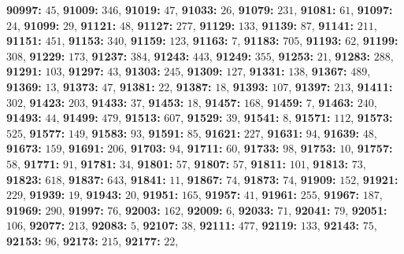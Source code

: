 \textsf{\bfseries 90997:} $45$, \textsf{\bfseries 91009:} $346$, \textsf{\bfseries 91019:} $47$, \textsf{\bfseries 91033:} $26$, \textsf{\bfseries 91079:} $231$, \textsf{\bfseries 91081:} $61$, \textsf{\bfseries 91097:} $24$, \textsf{\bfseries 91099:} $29$, \textsf{\bfseries 91121:} $48$, \textsf{\bfseries 91127:} $277$, \textsf{\bfseries 91129:} $133$, \textsf{\bfseries 91139:} $87$, \textsf{\bfseries 91141:} $211$, \textsf{\bfseries 91151:} $451$, \textsf{\bfseries 91153:} $340$, \textsf{\bfseries 91159:} $123$, \textsf{\bfseries 91163:} $7$, \textsf{\bfseries 91183:} $705$, \textsf{\bfseries 91193:} $62$, \textsf{\bfseries 91199:} $308$, \textsf{\bfseries 91229:} $173$, \textsf{\bfseries 91237:} $384$, \textsf{\bfseries 91243:} $443$, \textsf{\bfseries 91249:} $355$, \textsf{\bfseries 91253:} $21$, \textsf{\bfseries 91283:} $288$, \textsf{\bfseries 91291:} $103$, \textsf{\bfseries 91297:} $43$, \textsf{\bfseries 91303:} $245$, \textsf{\bfseries 91309:} $127$, \textsf{\bfseries 91331:} $138$, \textsf{\bfseries 91367:} $489$, \textsf{\bfseries 91369:} $13$, \textsf{\bfseries 91373:} $47$, \textsf{\bfseries 91381:} $22$, \textsf{\bfseries 91387:} $18$, \textsf{\bfseries 91393:} $107$, \textsf{\bfseries 91397:} $213$, \textsf{\bfseries 91411:} $302$, \textsf{\bfseries 91423:} $203$, \textsf{\bfseries 91433:} $37$, \textsf{\bfseries 91453:} $18$, \textsf{\bfseries 91457:} $168$, \textsf{\bfseries 91459:} $7$, \textsf{\bfseries 91463:} $240$, \textsf{\bfseries 91493:} $44$, \textsf{\bfseries 91499:} $479$, \textsf{\bfseries 91513:} $607$, \textsf{\bfseries 91529:} $39$, \textsf{\bfseries 91541:} $8$, \textsf{\bfseries 91571:} $112$, \textsf{\bfseries 91573:} $525$, \textsf{\bfseries 91577:} $149$, \textsf{\bfseries 91583:} $93$, \textsf{\bfseries 91591:} $85$, \textsf{\bfseries 91621:} $227$, \textsf{\bfseries 91631:} $94$, \textsf{\bfseries 91639:} $48$, \textsf{\bfseries 91673:} $159$, \textsf{\bfseries 91691:} $206$, \textsf{\bfseries 91703:} $94$, \textsf{\bfseries 91711:} $60$, \textsf{\bfseries 91733:} $98$, \textsf{\bfseries 91753:} $10$, \textsf{\bfseries 91757:} $58$, \textsf{\bfseries 91771:} $91$, \textsf{\bfseries 91781:} $34$, \textsf{\bfseries 91801:} $57$, \textsf{\bfseries 91807:} $57$, \textsf{\bfseries 91811:} $101$, \textsf{\bfseries 91813:} $73$, \textsf{\bfseries 91823:} $618$, \textsf{\bfseries 91837:} $643$, \textsf{\bfseries 91841:} $11$, \textsf{\bfseries 91867:} $74$, \textsf{\bfseries 91873:} $74$, \textsf{\bfseries 91909:} $152$, \textsf{\bfseries 91921:} $229$, \textsf{\bfseries 91939:} $19$, \textsf{\bfseries 91943:} $20$, \textsf{\bfseries 91951:} $165$, \textsf{\bfseries 91957:} $41$, \textsf{\bfseries 91961:} $255$, \textsf{\bfseries 91967:} $187$, \textsf{\bfseries 91969:} $290$, \textsf{\bfseries 91997:} $76$, \textsf{\bfseries 92003:} $162$, \textsf{\bfseries 92009:} $6$, \textsf{\bfseries 92033:} $71$, \textsf{\bfseries 92041:} $79$, \textsf{\bfseries 92051:} $106$, \textsf{\bfseries 92077:} $213$, \textsf{\bfseries 92083:} $5$, \textsf{\bfseries 92107:} $38$, \textsf{\bfseries 92111:} $477$, \textsf{\bfseries 92119:} $133$, \textsf{\bfseries 92143:} $75$, \textsf{\bfseries 92153:} $96$, \textsf{\bfseries 92173:} $215$, \textsf{\bfseries 92177:} $22$, 
